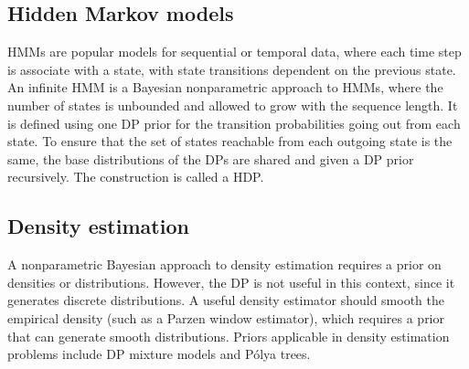 \subsection{Hidden Markov models}
\glspl{HMM} are popular models for sequential or temporal data, where each time step is associate with a state, with state transitions dependent on the previous state. An infinite \gls{HMM} is a Bayesian nonparametric approach to \glspl{HMM}, where the number of states is unbounded and allowed to grow with the sequence length. It is defined using one \gls{DP} prior for the transition probabilities going out from each state. To ensure that the set of states reachable from each outgoing state is the same, the base distributions of the \glspl{DP} are shared and given a \gls{DP} prior recursively. The construction is called a \gls{HDP}.

\subsection{Density estimation}
A nonparametric Bayesian approach to density estimation requires a prior on densities or distributions. However, the \gls{DP} is not useful in this context, since it generates discrete distributions. A useful density estimator should smooth the empirical density (such as a Parzen window estimator), which requires a prior that can generate smooth distributions. Priors applicable in density estimation problems include \gls{DP} mixture models and Pólya trees.







